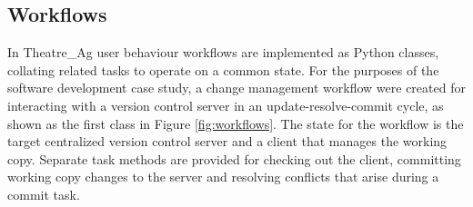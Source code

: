\documentclass{llncs}
\begin{document}

\subsection{Workflows}


In Theatre\_Ag user behaviour workflows are implemented as Python classes, collating related tasks to operate on a
common state. For the purposes of the software development case study, a change management workflow were created for
interacting with a version control server in an update-resolve-commit cycle, as shown as the first class in Figure
\ref{fig:workflows}.  The state for the workflow is the target centralized version control server and a client that
manages the working copy.  Separate task methods are provided for checking out the client, committing working copy
changes to the server and resolving conflicts that arise during a commit task.
\end{document}
